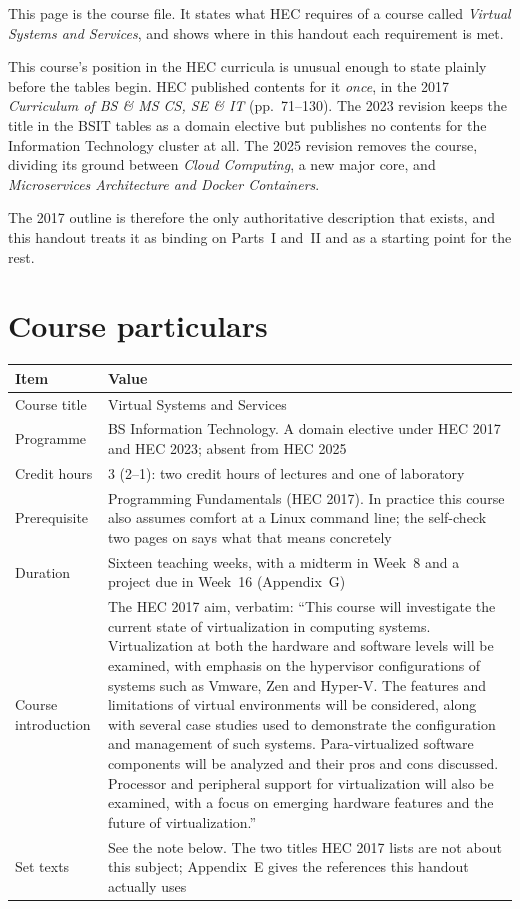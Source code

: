 This page is the course file. It states what HEC requires of a course called
\emph{Virtual Systems and Services}, and shows where in this handout each
requirement is met.

This course's position in the HEC curricula is unusual enough to state plainly
before the tables begin. HEC published contents for it \emph{once}, in the 2017
\emph{Curriculum of BS \& MS CS, SE \& IT} (pp.~71--130). The 2023 revision
keeps the title in the BSIT tables as a domain elective but publishes no
contents for the Information Technology cluster at all. The 2025 revision
removes the course, dividing its ground between \emph{Cloud Computing}, a new
major core, and \emph{Microservices Architecture and Docker Containers}.

The 2017 outline is therefore the only authoritative description that exists,
and this handout treats it as binding on Parts~I and~II and as a starting point
for the rest.

\section*{Course particulars}

\begin{longtable}{@{}L{4.2cm}L{11.0cm}@{}}
\toprule
{}
\textbf{Item} & \textbf{Value} \\
\midrule
\endhead
Course title & Virtual Systems and Services \\
Programme & BS Information Technology. A domain elective under HEC 2017 and
HEC 2023; absent from HEC 2025 \\
Credit hours & 3 (2--1): two credit hours of lectures and one of laboratory \\
Prerequisite & Programming Fundamentals (HEC 2017). In practice this course also
assumes comfort at a Linux command line; the self-check two pages on says what
that means concretely \\
Duration & Sixteen teaching weeks, with a midterm in Week~8 and a project due in
Week~16 (Appendix~G) \\
Course introduction & The HEC 2017 aim, verbatim: ``This course will investigate
the current state of virtualization in computing systems. Virtualization at both
the hardware and software levels will be examined, with emphasis on the
hypervisor configurations of systems such as Vmware, Zen and Hyper-V. The
features and limitations of virtual environments will be considered, along with
several case studies used to demonstrate the configuration and management of
such systems. Para-virtualized software components will be analyzed and their
pros and cons discussed. Processor and peripheral support for virtualization
will also be examined, with a focus on emerging hardware features and the future
of virtualization.'' \\
Set texts & See the note below. The two titles HEC 2017 lists are not about this
subject; Appendix~E gives the references this handout actually uses \\
\bottomrule
\end{longtable}

